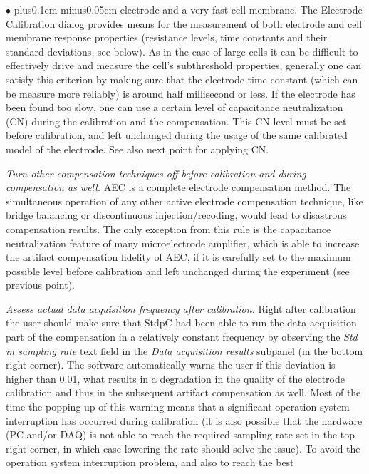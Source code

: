 \documentclass{article}
\newenvironment{myitem}{\begin{list}{$\bullet$}{\setlength{\leftmargin}{1.1em}
\itemsep0.1cm plus0.1cm minus0.05cm
\listparindent0cm
\addtolength{\labelsep}{0.5\labelsep}
\setlength{\labelwidth}{0.8em}
\setlength{\leftmargin}{\labelwidth}
\addtolength{\leftmargin}{\labelsep}
}}{\end{list}}
\begin{document}
\begin{myitem}
  electrode and a very fast cell membrane. The Electrode Calibration dialog
  provides means for the measurement of both electrode and cell membrane
  response properties (resistance levels, time constants and their standard
  deviations, see below). As in the case of large cells it can
  be difficult to effectively drive and measure the cell's subthreshold properties,
  generally one can satisfy this criterion by making sure that the electrode
  time constant (which can be measure more reliably) is around half
  millisecond or less. If the electrode has been found too
  slow, one can use a certain level of capacitance neutralization (CN)
  during the calibration and the compensation. This CN level must be set before
  calibration, and left unchanged during the usage of the same calibrated
  model of the electrode. See also next point for applying CN.
\item \emph{Turn other compensation techniques off before calibration and
  during compensation as well.} AEC is a complete
  electrode compensation method. The simultaneous operation of any
  other active electrode compensation technique, like bridge balancing or
  discontinuous injection/recoding, would lead to disastrous compensation
  results. The only exception from this rule is the capacitance neutralization
  feature of many microelectrode amplifier, which is able to increase the artifact
  compensation fidelity of AEC, if it is carefully set to the maximum
  possible level before calibration and left unchanged during the
  experiment (see previous point).
\item \emph{Assess actual data acquisition frequency after calibration.}
  Right after calibration the user should make sure that StdpC had been
  able to run the data acquisition part of the compensation in a relatively
  constant frequency by observing the \emph{Std in sampling rate} text
  field in the \emph{Data acquisition results} subpanel (in the bottom
  right corner). The software automatically warns the user if this
  deviation is higher than 0.01, what results in a degradation in the
  quality of the electrode calibration and thus in the subsequent artifact
  compensation as well. Most of the time the popping up of this warning
  means that a significant operation system interruption has occurred
  during calibration (it is also possible that the hardware (PC and/or DAQ)
  is not able to reach the required sampling rate set in the top right
  corner, in which case lowering the rate should solve the issue). To avoid
  the operation system interruption problem, and also to reach the best

\end{myitem}
\end{document}
